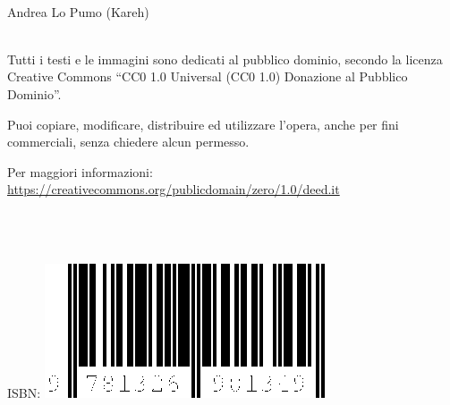 

\leavevmode\\
\textcopyright Andrea Lo Pumo (Kareh) \\
\leavevmode\\

\vfill

Tutti i testi e le immagini sono dedicati al pubblico dominio, secondo la licenza Creative Commons ``CC0 1.0 Universal (CC0 1.0) Donazione al Pubblico Dominio''.

Puoi copiare, modificare, distribuire ed utilizzare l'opera, anche per fini commerciali, senza chiedere alcun permesso.

Per maggiori informazioni: \url{https://creativecommons.org/publicdomain/zero/1.0/deed.it}

\leavevmode\\
\leavevmode\\
\leavevmode\\

ISBN: \includegraphics{lulu/isbn/978-1-326-90134-9-320px.png}
